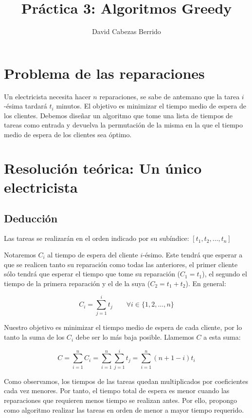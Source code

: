 \documentclass[a4]{article}
\author{David Cabezas Berrido}
\date{\vspace{-5mm}}
\title{\huge Práctica 3: Algoritmos Greedy \HRule\vspace{-4mm}}
\begin{document}
\maketitle
\vspace{20mm}
\tableofcontents
\newpage

\section{Problema de las reparaciones}
Un electricista necesita hacer $n$ reparaciones, se sabe de antemano
que la tarea $i$-ésima tardará $t_i$ minutos. El objetivo es minimizar
el tiempo medio de espera de los clientes. Debemos diseñar un
algoritmo que tome una lista de tiempos de tareas como entrada y
devuelva la permutación de la misma en la que el tiempo medio de
espera de los clientes sea óptimo.

\section{Resolución teórica: Un único electricista}

\subsection{Deducción}
Las tareas se realizarán en el orden indicado por su subíndice:
$[t_1, t_2,\ldots,t_n]$

Notaremos $C_i$ al tiempo de espera del cliente $i$-ésimo. Este tendrá
que esperar a que se realicen tanto su reparación como todas las
anteriores, el primer cliente sólo tendrá que esperar el tiempo que
tome su reparación ($C_1=t_1$), el segundo el tiempo de la primera
reparación y el de la suya ($C_2=t_1+t_2$). En general:

\[C_i=\sum_{j=1}^it_j \qquad \forall i \in \{1,2,\ldots,n\}\]

Nuestro objetivo es minimizar el tiempo medio de espera de cada
cliente, por lo tanto la suma de los $C_i$ debe ser lo más baja
posible. Llamemos $C$ a esta suma:

\[C = \sum_{i=1}^n C_i = \sum_{i=1}^n \sum_{j=1}^i t_j =
  \sum_{i=1}^n(n+1-i)t_i\]

Como observamos, los tiempos de las tareas quedan multiplicados por
coeficientes cada vez menores. Por tanto, el tiempo total de espera es
menor cuando las reparaciones que requieren menos tiempo se realizan
antes. Por ello, propongo como algoritmo realizar las tareas en orden
de menor a mayor tiempo requerido.
\end{document}
